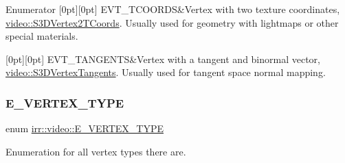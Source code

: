\begin{DoxyEnumFields}{Enumerator}
[0pt][0pt]{}\mbox{\label{namespaceirr_1_1video_a0e3b59e025e0d0db0ed2ee0ce904deacae69006c8156e11661da9aed6320a17f7}} 
E\+V\+T\+\_\+T\+C\+O\+O\+R\+DS&Vertex with two texture coordinates, \hyperlink{structirr_1_1video_1_1S3DVertex2TCoords}{video\+::\+S3\+D\+Vertex2\+T\+Coords}. Usually used for geometry with lightmaps or other special materials. \\
\hline

[0pt][0pt]{}\mbox{\label{namespaceirr_1_1video_a0e3b59e025e0d0db0ed2ee0ce904deacaa4ea5dea426bd98d9be1ac7f4c34e3b0}} 
E\+V\+T\+\_\+\+T\+A\+N\+G\+E\+N\+TS&Vertex with a tangent and binormal vector, \hyperlink{structirr_1_1video_1_1S3DVertexTangents}{video\+::\+S3\+D\+Vertex\+Tangents}. Usually used for tangent space normal mapping. \\
\hline

\end{DoxyEnumFields}
\mbox{\label{namespaceirr_1_1video_a0e3b59e025e0d0db0ed2ee0ce904deac}} 
\subsubsection{\texorpdfstring{E\+\_\+\+V\+E\+R\+T\+E\+X\+\_\+\+T\+Y\+PE}{E\_VERTEX\_TYPE}\hspace{0.1cm}{\footnotesize\ttfamily [2/2]}}
{\footnotesize\ttfamily enum \hyperlink{namespaceirr_1_1video_a0e3b59e025e0d0db0ed2ee0ce904deac}{irr\+::video\+::\+E\+\_\+\+V\+E\+R\+T\+E\+X\+\_\+\+T\+Y\+PE}}



Enumeration for all vertex types there are. 

